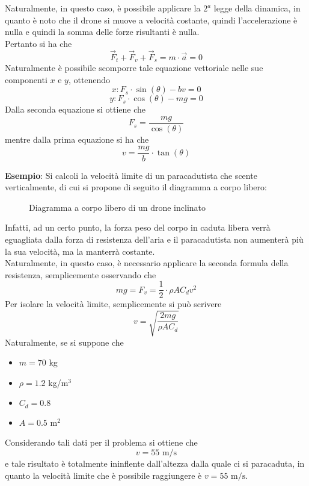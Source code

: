 \documentclass[a4paper]{extarticle}
\begin{document}
\vspace{1em}
\noindent
Naturalmente, in questo caso, è possibile applicare la $2^a$ legge della dinamica, in quanto è noto che il drone si muove a velocità costante, quindi l'accelerazione è nulla e quindi la somma delle forze risultanti è nulla.\\
Pertanto si ha che
\[\vec{F}_t + \vec{F}_v + \vec{F}_s = m \cdot \vec{a} = 0\]
Naturalmente è possibile scomporre tale equazione vettoriale nelle sue componenti $x$ e $y$, ottenendo
\[x: F_s \cdot \sin(\theta) - b v = 0\]
\[y: F_s \cdot \cos(\theta) - m g = 0\]
Dalla seconda equazione si ottiene che
\[F_s = \frac{m g}{\cos(\theta)}\]
mentre dalla prima equazione si ha che
\[v = \frac{mg}{b} \cdot \tan(\theta)\]

\vspace{1em}
\noindent
\textbf{Esempio}: Si calcoli la velocità limite di un paracadutista che scente verticalmente, di cui si propone di seguito il diagramma a corpo libero:

\vspace{1em}
\begin{figure}[H]
  \centering
  \caption{Diagramma a corpo libero di un drone inclinato}
  \label{fig:diagramma_corpo_libero_drone_inclinato}
\end{figure}

\vspace{1em}
\noindent
Infatti, ad un certo punto, la forza peso del corpo in caduta libera verrà eguagliata dalla forza di resistenza dell'aria e il paracadutista non aumenterà più la sua velocità, ma la manterrà costante.\\
Naturalmente, in questo caso, è necessario applicare la seconda formula della resistenza, semplicemente osservando che
\[mg = F_v = \frac{1}{2} \cdot \rho A C_d v^2\]
Per isolare la velocità limite, semplicemente si può scrivere
\[v = \sqrt{\frac{2 m g}{\rho A C_d}}\]
Naturalmente, se si suppone che
\begin{itemize}
  \item $m = 70$ kg
  \item $\rho = 1.2$ kg/m$^3$
  \item $C_d = 0.8$
  \item $A = 0.5$ m$^2$
\end{itemize}
Considerando tali dati per il problema si ottiene che
\[v = 55 \text{ m/s}\]
e tale risultato è totalmente ininflente dall'altezza dalla quale ci si paracaduta, in quanto la velocità limite che è possibile raggiungere è $v = 55 \text{ m/s}$.
\end{document}
